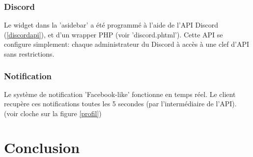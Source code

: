 \documentclass[10pt]{article}
\begin{document}
      \subsubsection{Discord}
	Le widget dans la 'asidebar' a été programmé à l'aide de l'API Discord (\ref{discordapi}), et d'un wrapper PHP (voir 'discord.phtml').
	Cette API se configure simplement: chaque administrateur du Discord à accès à une clef d'API sans restrictions.
	
      \subsubsection{Notification}
	Le système de notification 'Facebook-like' fonctionne en temps réel.
	Le client recupère ces notifications toutes les 5 secondes (par l'intermédiaire de l'API).
	(voir cloche sur la figure \ref{profil})

  \section{Conclusion}
  
  \newpage
\end{document}
